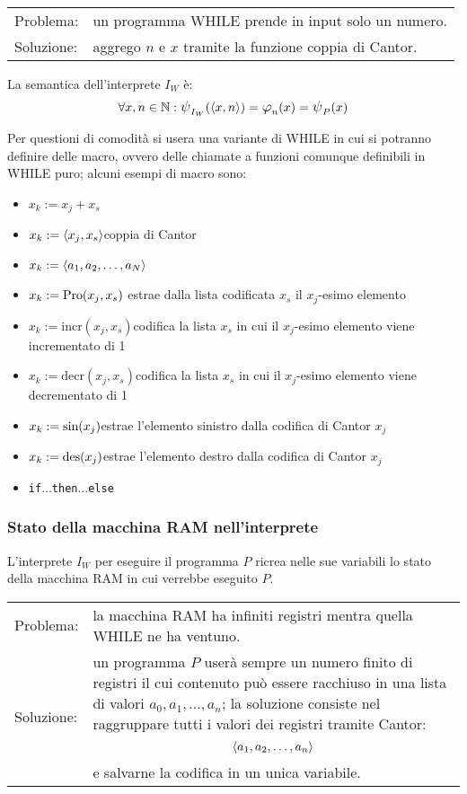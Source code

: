 \begin{tabular}{l p{}}
    Problema:& un programma WHILE prende in input solo un numero.\\[.5em]
    Soluzione:& aggrego $n$ e $x$ tramite la funzione coppia di Cantor.
\end{tabular}
\begin{figure}[h]
    \centering
    
\end{figure}

La semantica dell'interprete $I_W$ è:
$$\forall x,n\in\N: \semWHILE_{I_W}(\cantor{x,n})
=\semRAM_n(x)=\semWHILE_P(x)$$

Per questioni di comodità si usera una variante di WHILE in cui si potranno definire
delle macro, ovvero delle chiamate a funzioni comunque definibili in WHILE puro; alcuni
esempi di macro sono:
\begin{itemize}
    \item $x_k:=x_j+x_s$
    \item $x_k:=\langle x_j,x_s\rangle$\hfill coppia di Cantor
    \item $x_k:=\langle a_1,a_2,\dots,a_N\rangle$\hfill {}
    \item $x_k:=\text{Pro}(x_j,x_s)$ \hfill estrae dalla lista codificata $x_s$ il
        $x_j$-esimo elemento
    \item $x_k:=\text{incr}(x_j,x_s)$\hfill codifica la lista $x_s$ in cui il $x_j$-esimo elemento
        viene incrementato di 1
    \item $x_k:=\text{decr}(x_j,x_s)$\hfill codifica la lista $x_s$ in cui il $x_j$-esimo elemento
    viene decrementato di 1
    \item $x_k:=\text{sin}(x_j)$\hfill estrae l'elemento sinistro dalla codifica di Cantor $x_j$
    \item $x_k:=\text{des}(x_j)$\hfill estrae l'elemento destro dalla codifica di Cantor $x_j$
    \item \texttt{if}$\dots$\texttt{then}$\dots$\texttt{else}
\end{itemize}

\subsubsection*{Stato della macchina RAM nell'interprete}
L'interprete $I_W$ per eseguire il programma $P$ ricrea nelle sue variabili lo stato
della macchina RAM in cui verrebbe eseguito $P$.

\begin{tabular}{l p{}}
    Problema:& la macchina RAM ha infiniti registri mentra quella WHILE ne ha ventuno.
        \\[.5em]
    Soluzione:& un programma $P$ userà sempre un numero finito di registri il cui contenuto
        può essere racchiuso in una lista di valori $a_0,a_1,\dots,a_n$; la soluzione
        consiste nel raggruppare tutti i valori dei registri tramite Cantor:
        $$ \langle a_1,a_2,\dots,a_n\rangle $$ e salvarne la codifica in un unica variabile.
\end{tabular}


